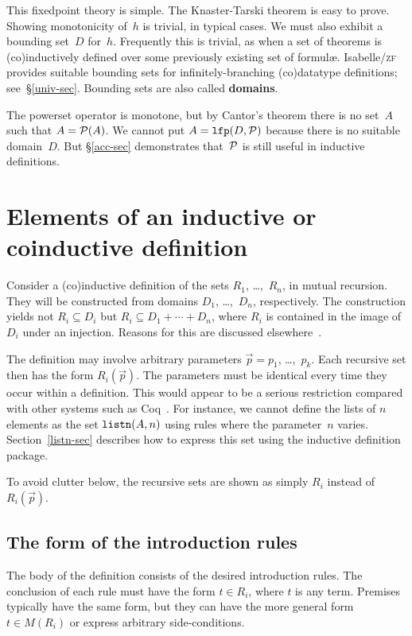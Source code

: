 \documentclass[12pt,a4paper]{article}
\newcommand\sbs{\subseteq}
\newcommand\defn[1]{{\bf#1}}
\newcommand\pow{{\cal P}}
\newcommand\lfp{\hbox{\tt lfp}}
\newcommand\listn{\hbox{\tt listn}}
\begin{document}
This fixedpoint theory is simple.  The Knaster-Tarski theorem is easy to
prove.  Showing monotonicity of~$h$ is trivial, in typical cases.  We must
also exhibit a bounding set~$D$ for~$h$.  Frequently this is trivial, as when
a set of theorems is (co)inductively defined over some previously existing set
of formul{\ae}.  Isabelle/\textsc{zf} provides suitable bounding sets for
infinitely-branching (co)datatype definitions; see~\S\ref{univ-sec}.  Bounding
sets are also called \defn{domains}.

The powerset operator is monotone, but by Cantor's theorem there is no
set~$A$ such that $A=\pow(A)$.  We cannot put $A=\lfp(D,\pow)$ because
there is no suitable domain~$D$.  But \S\ref{acc-sec} demonstrates
that~$\pow$ is still useful in inductive definitions.

\section{Elements of an inductive or coinductive definition}\label{basic-sec}
Consider a (co)inductive definition of the sets $R_1$, \ldots,~$R_n$, in
mutual recursion.  They will be constructed from domains $D_1$,
\ldots,~$D_n$, respectively.  The construction yields not $R_i\sbs D_i$ but
$R_i\sbs D_1+\cdots+D_n$, where $R_i$ is contained in the image of~$D_i$
under an injection.  Reasons for this are discussed
elsewhere~\cite[\S4.5]{paulson-set-II}.

The definition may involve arbitrary parameters $\vec{p}=p_1$,
\ldots,~$p_k$.  Each recursive set then has the form $R_i(\vec{p})$.  The
parameters must be identical every time they occur within a definition.  This
would appear to be a serious restriction compared with other systems such as
Coq~\cite{paulin-tlca}.  For instance, we cannot define the lists of
$n$ elements as the set $\listn(A,n)$ using rules where the parameter~$n$
varies.  Section~\ref{listn-sec} describes how to express this set using the
inductive definition package.

To avoid clutter below, the recursive sets are shown as simply $R_i$
instead of~$R_i(\vec{p})$.

\subsection{The form of the introduction rules}\label{intro-sec}
The body of the definition consists of the desired introduction rules.  The
conclusion of each rule must have the form $t\in R_i$, where $t$ is any term.
Premises typically have the same form, but they can have the more general form
$t\in M(R_i)$ or express arbitrary side-conditions.
\end{document}
